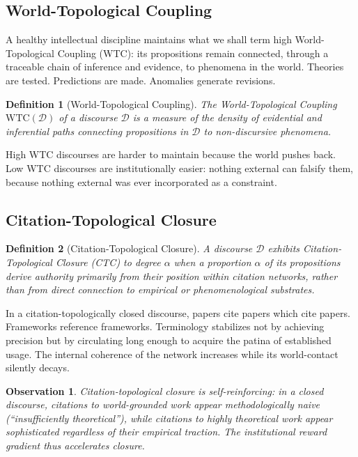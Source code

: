 \documentclass[12pt, a4paper]{article}
\newtheorem{definition}{Definition}
\newtheorem{observation}{Observation}
\begin{document}
\subsection{World-Topological Coupling}

A healthy intellectual discipline maintains what we shall term high World-Topological Coupling (WTC): its propositions remain connected, through a traceable chain of inference and evidence, to phenomena in the world. Theories are tested. Predictions are made. Anomalies generate revisions.

\begin{definition}[World-Topological Coupling]
The World-Topological Coupling $\mathrm{WTC}(\mathcal{D})$ of a discourse $\mathcal{D}$ is a measure of the density of evidential and inferential paths connecting propositions in $\mathcal{D}$ to non-discursive phenomena.
\end{definition}

High WTC discourses are harder to maintain because the world pushes back. Low WTC discourses are institutionally easier: nothing external can falsify them, because nothing external was ever incorporated as a constraint.

\subsection{Citation-Topological Closure}

\begin{definition}[Citation-Topological Closure]
A discourse $\mathcal{D}$ exhibits Citation-Topological Closure (CTC) to degree $\alpha$ when a proportion $\alpha$ of its propositions derive authority primarily from their position within citation networks, rather than from direct connection to empirical or phenomenological substrates.
\end{definition}

In a citation-topologically closed discourse, papers cite papers which cite papers. Frameworks reference frameworks. Terminology stabilizes not by achieving precision but by circulating long enough to acquire the patina of established usage. The internal coherence of the network increases while its world-contact silently decays.

\begin{observation}
Citation-topological closure is self-reinforcing: in a closed discourse, citations to world-grounded work appear methodologically naive (``insufficiently theoretical''), while citations to highly theoretical work appear sophisticated regardless of their empirical traction. The institutional reward gradient thus accelerates closure.
\end{observation}
\end{document}
